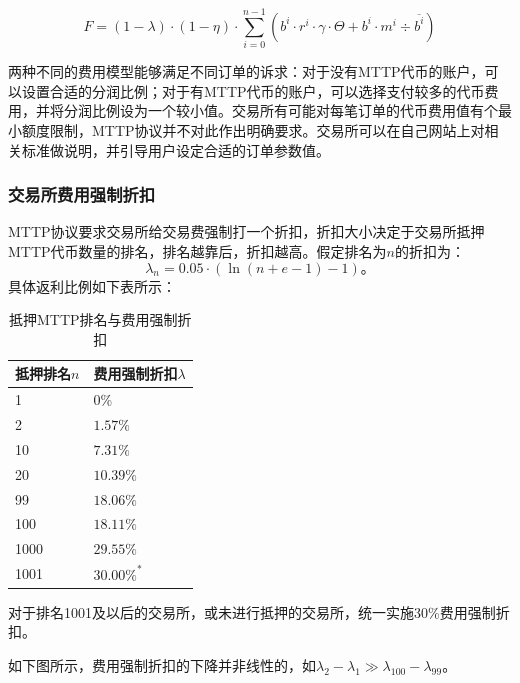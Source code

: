\documentclass[UTF8,nofonts]{ctexart}
\begin{document}
\begin{equation*}
F =(1-\lambda)\cdot (1-\eta) \cdot  \sum^{n-1}_{i=0} (b^i \cdot r^i \cdot \gamma \cdot \Theta + b^i \cdot m^i  \div \overline{b^i})
\end{equation*}


两种不同的费用模型能够满足不同订单的诉求：对于没有MTTP代币的账户，可以设置合适的分润比例；对于有MTTP代币的账户，可以选择支付较多的代币费用，并将分润比例设为一个较小值。交易所有可能对每笔订单的代币费用值有个最小额度限制，MTTP协议并不对此作出明确要求。交易所可以在自己网站上对相关标准做说明，并引导用户设定合适的订单参数值。

\subsubsection{交易所费用强制折扣}
MTTP协议要求交易所给交易费强制打一个折扣，折扣大小决定于交易所抵押MTTP代币数量的排名，排名越靠后，折扣越高。假定排名为$n$的折扣为：
$$\lambda_{n} = 0.05\cdot(\ln (n+e-1) - 1)\text{。}$$
具体返利比例如下表所示：


\begin{table}[hbt]
  \centering
\begin{tabular}{p{3.5cm}|p{3cm}} %
抵押排名$n$ & 费用强制折扣$\lambda$ \\ %
    \hline
1 & 0\%\\
\hline
2 & $1.57\%$\\
\hline
10 & $7.31\%$\\
\hline
20 & $10.39\%$\\
\hline
99 &$18.06\%$\\
\hline
100 &$18.11\%$\\
\hline
1000 &$29.55\%$\\
\hline
1001 &$30.00\%^*$\\
  \end{tabular}
\caption{抵押MTTP排名与费用强制折扣} %
\end{table}


对于排名1001及以后的交易所，或未进行抵押的交易所，统一实施30\%费用强制折扣。

如下图所示，费用强制折扣的下降并非线性的，如$\lambda_{2} - \lambda_{1} \gg \lambda_{100} - \lambda_{99}$。
\end{document}
